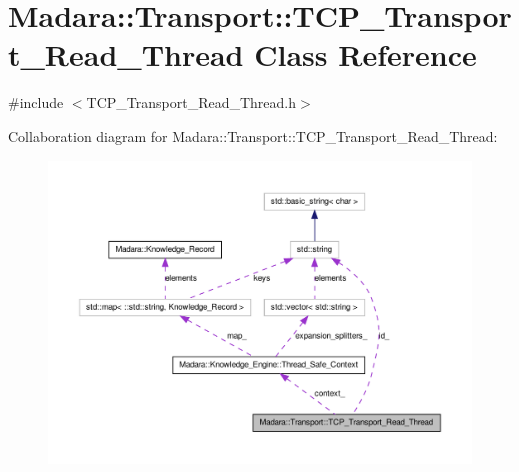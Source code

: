 \hypertarget{classMadara_1_1Transport_1_1TCP__Transport__Read__Thread}{
\section{Madara::Transport::TCP\_\-Transport\_\-Read\_\-Thread Class Reference}
\label{d8/d4c/classMadara_1_1Transport_1_1TCP__Transport__Read__Thread}
}


{\ttfamily \#include $<$TCP\_\-Transport\_\-Read\_\-Thread.h$>$}



Collaboration diagram for Madara::Transport::TCP\_\-Transport\_\-Read\_\-Thread:
\nopagebreak
\begin{figure}[H]
\begin{center}
\leavevmode
\includegraphics[width=400pt]{d5/de9/classMadara_1_1Transport_1_1TCP__Transport__Read__Thread__coll__graph}
\end{center}
\end{figure}
